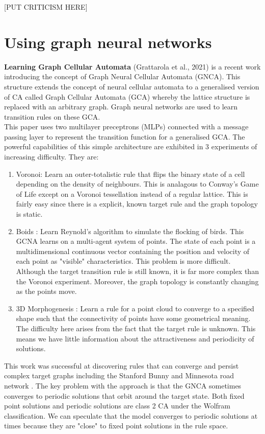 [PUT CRITICISM HERE]

\section{Using graph neural networks}

\noindent
\textbf{Learning Graph Cellular Automata} (Grattarola et al., 2021) \cite{grattarola2021learning} is a recent work introducing the concept of Graph Neural Cellular Automata (GNCA).
This structure extends the concept of neural cellular automata to a generalised version of CA called Graph Cellular Automata (GCA) whereby the lattice structure is replaced with an arbitrary graph.
Graph neural networks are used to learn transition rules on these GCA.\\

This paper uses two multilayer preceptrons (MLPs) connected with a message passing layer to represent the transition function for a generalised GCA.
The powerful capabilities of this simple architecture are exhibited in 3 experiments of increasing difficulty. They are:

\begin{enumerate}
  \item Voronoi: Learn an outer-totalistic rule that flips the binary state of a cell depending on the density of neighbours. This is analagous to Conway's Game of Life except on a Voronoi tessellation instead of a regular lattice. This is fairly easy since there is a explicit, known target rule and the graph topology is static. 
  \item Boids : Learn Reynold's algorithm \cite{reynolds1987flocks} to simulate the flocking of birds. This GCNA learns on a multi-agent system of points. The state of each point is a multidimensional continuous vector containing the position and velocity of each point as "visible" characteristics. This problem is more difficult. Although the target transition rule is still known, it is far more complex than the Voronoi experiment. Moreover, the graph topology is constantly changing as the points move.
  \item 3D Morphogenesis : Learn a rule for a point cloud to converge to a specified shape such that the connectivity of points have some geometrical meaning. The difficulty here arises from the fact that the target rule is unknown. This means we have little information about the attractiveness and periodicity of solutions.
\end{enumerate}

This work was successful at discovering rules that can converge and persist complex target graphs including the Stanford Bunny  and Minnesota road network .
The key problem with the approach is that the GNCA sometimes converges to periodic solutions that orbit around the target state. 
Both fixed point solutions and periodic solutions are class 2 CA under the Wolfram classification.
We can speculate that the model converges to periodic solutions at times because they are "close" to fixed point solutions in the rule space.



